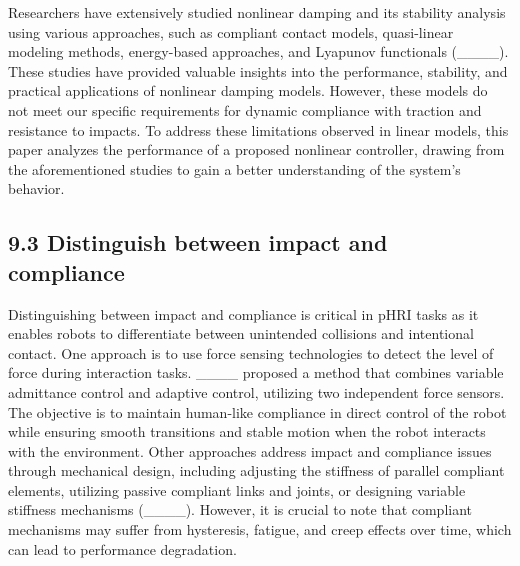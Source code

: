 

Researchers have extensively studied nonlinear damping and its stability analysis using various approaches, such as compliant contact models, quasi-linear modeling methods, energy-based approaches, and Lyapunov functionals (____). These studies have provided valuable insights into the performance, stability, and practical applications of nonlinear damping models. However, these models do not meet our specific requirements for dynamic compliance with traction and resistance to impacts. To address these limitations observed in linear models, this paper analyzes the performance of a proposed nonlinear controller, drawing from the aforementioned studies to gain a better understanding of the system's behavior.


\subsection{9.3 Distinguish between impact and compliance}

Distinguishing between impact and compliance is critical in pHRI tasks as it enables robots to differentiate between unintended collisions and intentional contact. One approach is to use force sensing technologies to detect the level of force during interaction tasks. ____ proposed a method that combines variable admittance control and adaptive control, utilizing two independent force sensors. The objective is to maintain human-like compliance in direct control of the robot while ensuring smooth transitions and stable motion when the robot interacts with the environment. Other approaches address impact and compliance issues through mechanical design, including adjusting the stiffness of parallel compliant elements, utilizing passive compliant links and joints, or designing variable stiffness mechanisms (____). However, it is crucial to note that compliant mechanisms may suffer from hysteresis, fatigue, and creep effects over time, which can lead to performance degradation.



